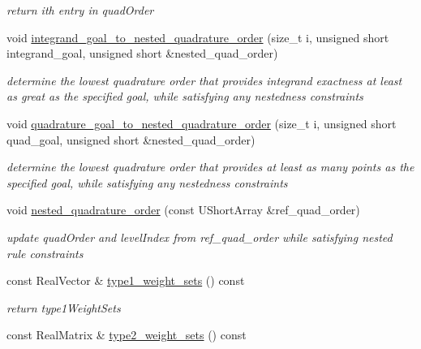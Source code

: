 \begin{DoxyCompactItemize}
\begin{DoxyCompactList}\small\item\em return ith entry in quad\+Order \end{DoxyCompactList}\item 
void \hyperlink{classPecos_1_1TensorProductDriver_a35d1e0a68d492e16dc5ae233916353f8}{integrand\+\_\+goal\+\_\+to\+\_\+nested\+\_\+quadrature\+\_\+order} (size\+\_\+t i, unsigned short integrand\+\_\+goal, unsigned short \&nested\+\_\+quad\+\_\+order)
\begin{DoxyCompactList}\small\item\em determine the lowest quadrature order that provides integrand exactness at least as great as the specified goal, while satisfying any nestedness constraints \end{DoxyCompactList}\item 
void \hyperlink{classPecos_1_1TensorProductDriver_a06c1986b1c8f48fbbf1a951d03d4459e}{quadrature\+\_\+goal\+\_\+to\+\_\+nested\+\_\+quadrature\+\_\+order} (size\+\_\+t i, unsigned short quad\+\_\+goal, unsigned short \&nested\+\_\+quad\+\_\+order)
\begin{DoxyCompactList}\small\item\em determine the lowest quadrature order that provides at least as many points as the specified goal, while satisfying any nestedness constraints \end{DoxyCompactList}\item 
void \hyperlink{classPecos_1_1TensorProductDriver_a3a40597c2e3671a4c483351731d2c5eb}{nested\+\_\+quadrature\+\_\+order} (const U\+Short\+Array \&ref\+\_\+quad\+\_\+order)\label{classPecos_1_1TensorProductDriver_a3a40597c2e3671a4c483351731d2c5eb}

\begin{DoxyCompactList}\small\item\em update quad\+Order and level\+Index from ref\+\_\+quad\+\_\+order while satisfying nested rule constraints \end{DoxyCompactList}\item 
const Real\+Vector \& \hyperlink{classPecos_1_1TensorProductDriver_ae858d8bd4c244a98b0ff43c979b65e69}{type1\+\_\+weight\+\_\+sets} () const \label{classPecos_1_1TensorProductDriver_ae858d8bd4c244a98b0ff43c979b65e69}

\begin{DoxyCompactList}\small\item\em return type1\+Weight\+Sets \end{DoxyCompactList}\item 
const Real\+Matrix \& \hyperlink{classPecos_1_1TensorProductDriver_aacf52fa6f04443949a70c62ee3d718f7}{type2\+\_\+weight\+\_\+sets} () const \label{classPecos_1_1TensorProductDriver_aacf52fa6f04443949a70c62ee3d718f7}


\end{DoxyCompactItemize}
